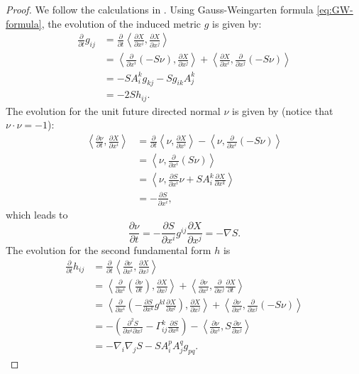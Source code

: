 \documentclass[reqno]{amsart}
\theoremstyle{remark}
\newcommand{\pd}[2]{\frac{\partial {#1}}{\partial {#2}}}
\newcommand{\ip}[2]{\ensuremath{\left< {#1}, {#2} \right>}}
\theoremstyle{definition}
\numberwithin{equation}{section}
\begin{document}
\begin{proof}
We follow the calculations in \cite{co-compact}. Using Gauss-Weingarten formula \eqref{eq:GW-formula}, the evolution of the induced metric \(g\) is given by:
\begin{equation}
    \begin{aligned}
        \pd{}{t}g_{ij} &= \pd{}{t}\ip{\pd{X}{x^i}}{\pd{X}{x^j}} \\
        &= \ip{\pd{}{x^i}(-S\nu)}{\pd{X}{x^j}} + \ip{\pd{X}{x^i}}{\pd{}{x^j}(-S\nu)} \\
        &= -SA_i^k g_{kj} - S g_{ik}A_j^k \\
        &= -2Sh_{ij}.
    \end{aligned}
\end{equation}
The evolution for the unit future directed normal \(\nu\) is given by (notice that \(\nu \cdot \nu = -1\)):  
\begin{equation*}
    \begin{aligned}
        \ip{\pd{\nu}{t}}{\pd{X}{x^i}} &= \pd{}{t}\ip{\nu}{\pd{X}{x^i}} - \ip{\nu}{\pd{}{x^i}(-S\nu)} \\
        &= \ip{\nu}{\pd{}{x^i}(S\nu)} \\
        &= \ip{\nu}{\pd{S}{x^i}\nu + SA_i^k \pd{X}{x^k}} \\
        &= -\pd{S}{x^i},
    \end{aligned}
\end{equation*}
which leads to 
\begin{equation}
    \pd{\nu}{t} = -\pd{S}{x^i} g^{ij} \pd{X}{x^j} = -\nabla S.
\end{equation}
The evolution for the second fundamental form \(h\) is
\begin{equation}
    \begin{aligned}
        \pd{}{t}h_{ij} &= \pd{}{t}\ip{\pd{\nu}{x^i}}{\pd{X}{x^j}} \\
        &= \ip{\pd{}{x^i}\left(\pd{\nu}{t}\right)}{\pd{X}{x^j}} + \ip{\pd{\nu}{x^i}}{\pd{}{x^j}\pd{X}{t}} \\
        &= \ip{\pd{}{x^i}\left(-\pd{S}{x^k}g^{kl}\pd{X}{x^l} \right)}{\pd{X}{x^j}} + \ip{\pd{\nu}{x^i}}{\pd{}{x^j}(-S\nu)}\\
        &= -\left(\frac{\partial^2 S}{\partial x^i \partial x^j} - \Gamma_{ij}^k \pd{S}{x^k} \right) - \ip{\pd{\nu}{x^i}}{S \pd{\nu}{x^j}} \\
        &= -\nabla_i\nabla_j S - SA_i^p A_j^q g_{pq}.
    \end{aligned}
\end{equation}


\end{proof}
\end{document}
